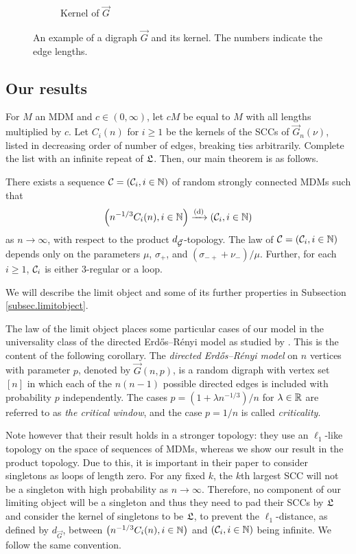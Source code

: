 \begin{figure}[htbp]
\begin{subfigure}[htbp]{0.45\textwidth}
        \caption{Kernel of $\vec{G}$}
    \end{subfigure}
    \caption{An example of a digraph $\vec{G}$ and its kernel. The numbers indicate the edge lengths.}
    \label{fig:kernel}
\end{figure}



\subsection{Our results}

For $M$ an MDM and $c\in (0,\infty)$, let $cM$ be equal to $M$ with all lengths multiplied by $c$. Let $C_i(n)$ for $i\geq 1$ be the kernels of the SCCs of $\vec{G}_n(\nu)$, listed in decreasing order of number of edges, breaking ties arbitrarily. Complete the list with an infinite repeat of $\mathfrak L$. Then, our main theorem is as follows.
\begin{theorem}\label{thm.main}
There exists a sequence ${\mathcal C}=({\mathcal C}_i,i\in {\mathbb N})$ of random strongly connected MDMs such that 
$$\left(n^{-1/3}C_i(n),i\in {\mathbb N}\right)\xrightarrow[]{\mathrm{(d)}}\left({\mathcal C}_i,i\in {\mathbb N}\right)$$
as $n\to \infty$, with respect to the product $d_{\vec{{\mathcal G}}}$-topology. The law of ${\mathcal C}=({\mathcal C}_i,i\in {\mathbb N})$ depends only on the parameters $\mu$, $\sigma_+$, and $(\sigma_{-+}+\nu_-)/\mu$. Further, for each $i\geq 1$, ${\mathcal C}_i$ is either $3$-regular or a loop.
\end{theorem}
We will describe the limit object and some of its further properties in Subsection \ref{subsec.limitobject}.

The law of the limit object places some particular cases of our model in the universality class of the directed Erd\H{o}s--Rényi model as studied by \citet{goldschmidtScalingLimitCritical2021}. This is the content of the following corollary. The \emph{directed Erd\H{o}s--Rényi model} on $n$ vertices with parameter $p$, denoted by $\vec{G}(n,p)$, is a random digraph with vertex set $[n]$ in which each of the $n(n-1)$ possible directed edges is included with probability $p$ independently. The cases $p=(1+\lambda n^{-1/3})/n$ for $\lambda\in{\mathbb R}$ are referred to as \emph{the critical window}, and the case $p=1/n$ is called \emph{criticality}.

Note however that their result holds in a stronger topology: they use an $\ell_1$-like topology on the space of sequences of MDMs, whereas we show our result in the product topology. Due to this, it is important in their paper to consider singletons as loops of length zero. For any fixed $k$, the $k$th largest SCC will not be a singleton with high probability as $n \to \infty$. Therefore, no component of our limiting object will be a singleton and thus they need to pad their SCCs by $\mathfrak L$ and consider the kernel of singletons to be $\mathfrak L$, to prevent the $\ell_1$-distance, as defined by $d_{\vec{G}}$, between $\left(n^{-1/3}C_i(n),i\in {\mathbb N}\right)$ and $\left({\mathcal C}_i,i\in {\mathbb N}\right)$ being infinite. We follow the same convention.

